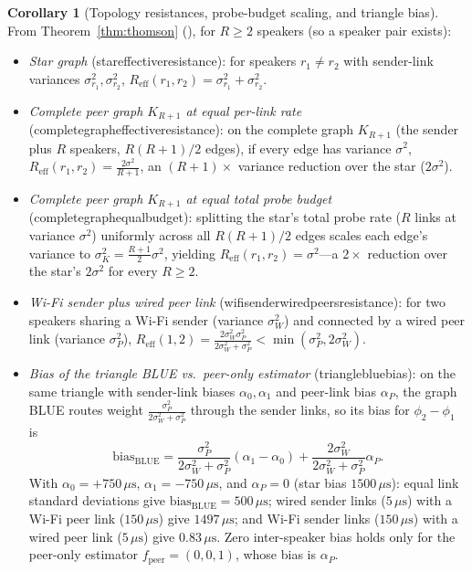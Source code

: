 \documentclass[11pt,a4paper]{article}
\DeclareRobustCommand{\lean}[1]{{\ttfamily\def\_{\textunderscore\allowbreak}#1}}
\theoremstyle{definition}
\newtheorem{corollary}[definition]{Corollary}
\begin{document}
\begin{corollary}[Topology resistances, probe-budget scaling, and triangle bias]
\label{cor:topologies}
From Theorem~\ref{thm:thomson} (), for $R \ge 2$ speakers
(so a speaker pair exists):
\begin{itemize}
\item \emph{Star graph} (\lean{star\_effective\_resistance}): for speakers
  $r_1 \ne r_2$ with sender-link variances $\sigma_{r_1}^2, \sigma_{r_2}^2$,
  $R_{\mathrm{eff}}(r_1, r_2) = \sigma_{r_1}^2 + \sigma_{r_2}^2$.
\item \emph{Complete peer graph $K_{R+1}$ at equal per-link rate}
  (\lean{complete\_graph\_effective\_resistance}): on the complete graph
  $K_{R+1}$ (the sender plus $R$ speakers, $R(R+1)/2$ edges), if every edge has
  variance $\sigma^2$, $R_{\mathrm{eff}}(r_1, r_2) = \frac{2\sigma^2}{R+1}$, an
  $(R+1)\times$ variance reduction over the star ($2\sigma^2$).
\item \emph{Complete peer graph $K_{R+1}$ at equal total probe budget}
  (\lean{complete\_graph\_equal\_budget}): splitting the star's total probe
  rate ($R$ links at variance $\sigma^2$) uniformly across all $R(R+1)/2$ edges
  scales each edge's variance to $\sigma_K^2 = \frac{R+1}{2}\sigma^2$, yielding
  $R_{\mathrm{eff}}(r_1, r_2) = \sigma^2$—a $2\times$ reduction over the star's
  $2\sigma^2$ for every $R \ge 2$.
\item \emph{Wi-Fi sender plus wired peer link}
  (\lean{wifi\_sender\_wired\_peers\_resistance}): for two speakers sharing a
  Wi-Fi sender (variance $\sigma_W^2$) and connected by a wired peer link
  (variance $\sigma_P^2$),
  $R_{\mathrm{eff}}(1, 2) = \frac{2 \sigma_W^2 \sigma_P^2}{2 \sigma_W^2 + \sigma_P^2}
   < \min(\sigma_P^2, 2 \sigma_W^2)$.
\item \emph{Bias of the triangle BLUE vs.\ peer-only estimator}
  (\lean{triangle\_blue\_bias}): on the same triangle with sender-link biases
  $\alpha_0, \alpha_1$ and peer-link bias $\alpha_P$, the graph BLUE routes
  weight $\frac{\sigma_P^2}{2 \sigma_W^2 + \sigma_P^2}$ through the sender
  links, so its bias for $\phi_2 - \phi_1$ is
  \[
    \mathrm{bias}_{\mathrm{BLUE}}
    = \frac{\sigma_P^2}{2 \sigma_W^2 + \sigma_P^2}(\alpha_1 - \alpha_0)
    + \frac{2 \sigma_W^2}{2 \sigma_W^2 + \sigma_P^2}\alpha_P .
  \]
  With $\alpha_0 = +750\,\mu\text{s}$, $\alpha_1 = -750\,\mu\text{s}$, and
  $\alpha_P = 0$ (star bias $1500\,\mu\text{s}$): equal link standard deviations
  give $\mathrm{bias}_{\mathrm{BLUE}} = 500\,\mu\text{s}$; wired sender links
  ($5\,\mu\text{s}$) with a Wi-Fi peer link ($150\,\mu\text{s}$) give
  $1497\,\mu\text{s}$; and Wi-Fi sender links ($150\,\mu\text{s}$) with a wired
  peer link ($5\,\mu\text{s}$) give $0.83\,\mu\text{s}$. Zero inter-speaker
  bias holds only for the peer-only estimator $f_{\mathrm{peer}} = (0, 0, 1)$,
  whose bias is $\alpha_P$.
\end{itemize}
\end{corollary}
\end{document}
